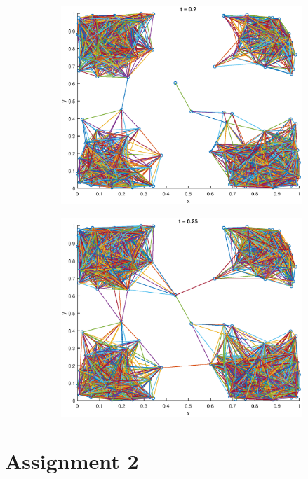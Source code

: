 \documentclass[10pt]{article}
\begin{document}
\begin{figure}
\begin{subfigure}[b]{.49\textwidth}
	   	\includegraphics[width=\columnwidth]{Ass1_20.eps}
	   	\caption{}
	   	\label{fig1e}
	\end{subfigure}
	\begin{subfigure}[b]{.49\textwidth}
		\includegraphics[width=\columnwidth]{Ass1_25.eps}
		\caption{}
		\label{fig1f}
	\end{subfigure}	
  \label{fig1.1}
\end{figure}

\section*{Assignment 2}
\end{document}
